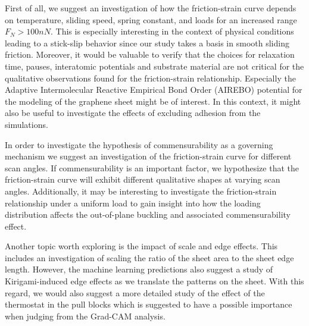 First of all, we suggest an investigation of how the friction-strain curve
depends on temperature, sliding speed, spring constant, and loads for an
increased range $F_N > 100 nN$. This is especially interesting in the context of
physical conditions leading to a stick-slip behavior since our study takes a
basis in smooth sliding friction. Moreover, it would be valuable to verify that
the choices for relaxation time, pauses, interatomic potentials and substrate
material are not critical for the qualitative observations found for the
friction-strain relationship. Especially the Adaptive Intermolecular Reactive
Empirical Bond Order (AIREBO) potential for the modeling of the graphene sheet
might be of interest. In this context, it might also be useful to investigate
the effects of excluding adhesion from the simulations. 

In order to investigate the hypothesis of commensurability as a governing
mechanism we suggest an investigation of the friction-strain curve for different
scan angles. If commensurability is an important factor, we hypothesize that the friction-strain curve will exhibit different qualitative shapes at varying scan
angles. Additionally, it may be interesting to investigate the friction-strain
relationship under a uniform load to gain insight into how the loading
distribution affects the out-of-plane buckling and associated commensurability
effect.

Another topic worth exploring is the impact of scale and edge effects. This includes an investigation of scaling the ratio of the sheet area to the sheet edge length. However, the machine learning predictions also suggest a study of Kirigami-induced edge effects as we translate the patterns on the sheet. With this regard, we would also suggest a more detailed study of the effect of the thermostat in the pull blocks which is suggested to have a possible importance when judging from the Grad-CAM analysis. 

